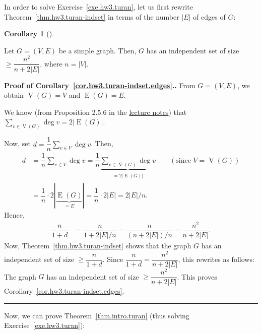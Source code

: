 \documentclass[numbers=enddot,12pt,final,onecolumn,notitlepage]{scrartcl}%
\theoremstyle{definition}
\newtheorem{coro}[theo]{Corollary}
\newenvironment{corollary}[1][]
{\begin{coro}[#1]\begin{leftbar}}
{\end{leftbar}\end{coro}}
\newenvironment{proof}[1][Proof]{\noindent\textbf{#1.} }{\ \rule{0.5em}{0.5em}}
\let\sumnonlimits\sum
\renewcommand{\sum}{\sumnonlimits\limits}
\newcommand{\abs}[1]{\left| #1 \right|}
\newcommand{\tup}[1]{\left( #1 \right)}
\newcommand{\verts}[1]{\operatorname{V}\left( #1 \right)}
\newcommand{\edges}[1]{\operatorname{E}\left( #1 \right)}
\newcommand{\underbrack}[2]{\underbrace{#1}_{\substack{#2}}}
\begin{document}
In order to solve Exercise~\ref{exe.hw3.turan}, let us first rewrite
Theorem~\ref{thm.hw3.turan-indset} in terms of the number $\abs{E}$ of
edges of $G$:

\begin{corollary} \label{cor.hw3.turan-indset.edges}
Let $G = \tup{V, E}$ be a simple graph.
Then, $G$ has an independent set of size
$\geq \dfrac{n^2}{n+2\abs{E}}$, where $n = \abs{V}$.
\end{corollary}

\begin{proof}[Proof of Corollary~\ref{cor.hw3.turan-indset.edges}.]
From $G = \tup{V, E}$, we obtain $\verts{G} = V$ and $\edges{G} = E$.

We know (from
Proposition 2.5.6 in the
\href{http://www.cip.ifi.lmu.de/~grinberg/t/17s/nogra.pdf}{lecture notes})
that $\sum_{v \in \verts{G}} \deg v = 2 \abs{\edges{G}}$.

Now, set $d = \dfrac{1}{n} \sum_{v \in V} \deg v$.
Then,
\begin{align*}
d
&= \dfrac{1}{n} \sum_{v \in V} \deg v
= \dfrac{1}{n} \underbrack{\sum_{v \in \verts{G}} \deg v}
                          {= 2 \abs{\edges{G}}}
\qquad \left(\text{since } V = \verts{G}\right) \\
&= \dfrac{1}{n} \cdot 2 \abs{\underbrace{\edges{G}}_{= E}}
= \dfrac{1}{n} \cdot 2 \abs{E} = 2 \abs{E} / n .
\end{align*}
Hence,
\begin{align*}
\dfrac{n}{1+d}
&= \dfrac{n}{1 + 2 \abs{E} / n}
= \dfrac{n}{\tup{n + 2 \abs{E}} / n}
= \dfrac{n^2}{n+2\abs{E}}.
\end{align*}
Now, Theorem~\ref{thm.hw3.turan-indset} shows that the graph
$G$ has an independent set of size $\geq \dfrac{n}{1+d}$.
Since $\dfrac{n}{1+d} = \dfrac{n^2}{n+2\abs{E}}$, this rewrites as
follows:
The graph $G$ has an independent set of size
$\geq \dfrac{n^2}{n+2\abs{E}}$.
This proves Corollary~\ref{cor.hw3.turan-indset.edges}.
\end{proof}

Now, we can prove Theorem~\ref{thm.intro.turan} (thus solving
Exercise~\ref{exe.hw3.turan}):
\end{document}

